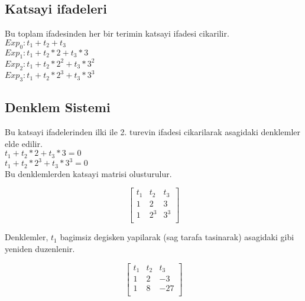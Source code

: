 \documentclass{article}
\begin{document}
\subsection{Katsayi ifadeleri}
Bu toplam ifadesinden her bir terimin katsayi ifadesi cikarilir.\\
$\displaystyle Exp_{0}: t_{1}+t_{2}+t_{3}$\\
$\displaystyle Exp_{1}: t_{1}+t_{2}*2+t_{3}*3$\\
$\displaystyle Exp_{2}: t_{1}+t_{2}*2^{2}+t_{3}*3^{2}$\\
$\displaystyle Exp_{3}: t_{1}+t_{2}*2^{3}+t_{3}*3^{3}$\\
\subsection{Denklem Sistemi}
Bu katsayi ifadelerinden ilki ile 2. turevin ifadesi cikarilarak asagidaki denklemler elde edilir.\\
$\displaystyle t_{1}+t_{2}*2+t_{3}*3=0$\\
$\displaystyle t_{1}+t_{2}*2^{3}+t_{3}*3^{3}=0$\\
Bu denklemlerden katsayi matrisi olusturulur.
\begin{center}
$$ \left[\begin{array}{rrr}
t_{1} & t_{2} & t_{3}\\
1 & 2 & 3\\
1 & 2^{3} & 3^{3}\\
\end{array}\right] $$
\end{center}
Denklemler, $t_{1}$ bagimsiz degisken yapilarak (sag tarafa tasinarak) asagidaki gibi yeniden duzenlenir.\\
\begin{center}
$$ \left[\begin{array}{rr|r}
t_{1} & t_{2} & t_{3}\\
1 & 2 & -3\\
1 & 8 & -27\\
\end{array}\right] $$
\end{center}
\end{document}
